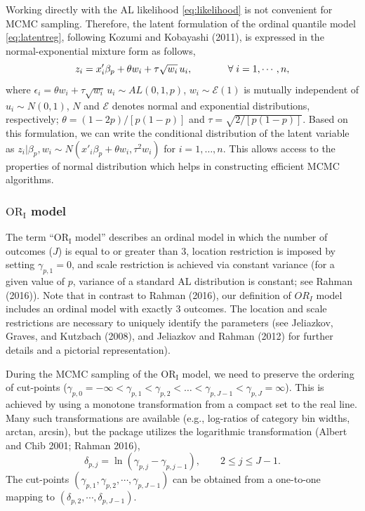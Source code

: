 Working directly with the AL likelihood \eqref{eq:likelihood} is not convenient for MCMC sampling. Therefore, the latent formulation of the ordinal quantile model \eqref{eq:latentreg}, following Kozumi and Kobayashi (2011), is expressed in the normal-exponential mixture form as follows,
\begin{equation}
z_{i} = x'_{i} \beta_{p} + \theta w_{i} + \tau \sqrt{w_{i}} \,u_{i}, \hspace{0.5in} \forall \; i=1, \cdots, n, \label{eq:latentregNE}
\end{equation}
where \(\epsilon_{i} = \theta w_{i} + \tau \sqrt{w_{i}} \, u_{i} \sim AL(0,1,p)\), \(w_{i} \sim\mathcal{E}(1)\) is mutually independent of \(u_{i} \sim N(0,1)\), \(N\) and \(\mathcal{E}\) denotes normal and exponential distributions, respectively; \(\theta = (1-2p)/[p(1-p)]\) and \(\tau = \sqrt{2/[p(1-p)]}\). Based on this formulation, we can write the conditional distribution of the latent variable as \(z_{i}|\beta_{p},w_{i} \sim N( x'_{i}\beta_{p} + \theta w_{i}, \tau^{2} w_{i})\) for \(i=1,\ldots,n\). This allows access to the properties of normal distribution which helps in constructing efficient MCMC algorithms.

\hypertarget{sec:ORI}{%
\subsubsection{\texorpdfstring{\(\mathrm{OR_{I}}\) model}{\textbackslash mathrm\{OR\_\{I\}\} model}}\label{sec:ORI}}

The term ``\(\mathrm{OR_{I}}\) model'' describes an ordinal model in which the number of outcomes (\(J\)) is equal to or greater than 3, location restriction is imposed by setting \(\gamma_{p,1} = 0\), and scale restriction is achieved via constant variance (for a given value of \(p\), variance of a standard AL distribution is constant; see Rahman (2016)). Note that in contrast to Rahman (2016), our definition of \(OR_{I}\) model includes an ordinal model with exactly 3 outcomes. The location and scale restrictions are necessary to uniquely identify the parameters (see Jeliazkov, Graves, and Kutzbach (2008), and Jeliazkov and Rahman (2012) for further details and a pictorial representation).

During the MCMC sampling of the \(\mathrm{OR_{I}}\) model, we need to preserve the ordering of cut-points (\(\gamma_{p,0}=-\infty < \gamma_{p,1} < \gamma_{p,2} < \ldots < \gamma_{p,J-1} < \gamma_{p,J}=\infty\)). This is achieved by using a monotone transformation from a compact set to the real line. Many such transformations are available (e.g., log-ratios of category bin widths, arctan, arcsin), but the  package utilizes the logarithmic transformation (Albert and Chib 2001; Rahman 2016),
\begin{equation} 
\delta_{p,j} = \ln ( \gamma_{p,j} - \gamma_{p,j-1} ), \qquad 2 \le j \le J-1. 
\label{eq:logtransformation}
\end{equation}
The cut-points \((\gamma_{p,1}, \gamma_{p,2}, \cdots, \gamma_{p,J-1})\) can be obtained from a one-to-one mapping to \((\delta_{p,2}, \cdots, \delta_{p,J-1})\).

